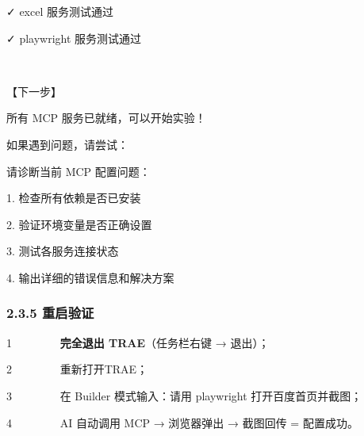 \documentclass[
  american,
  chinese,
]{ctexart}
\begin{document}
\foreignlanguage{american}{✓}\foreignlanguage{american}{ excel }{服务测试通过}\foreignlanguage{american}{}

\foreignlanguage{american}{✓}\foreignlanguage{american}{ playwright }{服务测试通过}\foreignlanguage{american}{}

\foreignlanguage{american}{}

~

{【下一步】}\foreignlanguage{american}{}

{所有}\foreignlanguage{american}{ MCP }{服务已就绪，可以开始实验！}\foreignlanguage{american}{}

{如果遇到问题，请尝试：}\foreignlanguage{american}{}

{请诊断当前}\foreignlanguage{american}{ MCP }{配置问题：}\foreignlanguage{american}{}

\foreignlanguage{american}{1. }{检查所有依赖是否已安装}\foreignlanguage{american}{}

\foreignlanguage{american}{2. }{验证环境变量是否正确设置}\foreignlanguage{american}{}

\foreignlanguage{american}{3. }{测试各服务连接状态}\foreignlanguage{american}{}

\foreignlanguage{american}{4. }{输出详细的错误信息和解决方案}\foreignlanguage{american}{}

\subsubsection{\texorpdfstring{\foreignlanguage{american}{2.3.5 }{重启验证}\foreignlanguage{american}{}}{2.3.5 重启验证}}\label{ux91cdux542fux9a8cux8bc1}

\foreignlanguage{american}{{1{~~~~~~~~
}}}\textbf{{完全退出}\foreignlanguage{american}{ TRAE}}{（任务栏右键}{ \foreignlanguage{american}{→ }}{退出）；}\foreignlanguage{american}{}

\foreignlanguage{american}{{2{~~~~~~~~
}}}{\foreignlanguage{american}{重新打开}}\foreignlanguage{american}{ {TRAE{；}}}

\foreignlanguage{american}{{3{~~~~~~~~
}}}\foreignlanguage{american}{在}\foreignlanguage{american}{ Builder }{\foreignlanguage{american}{模式输入：请用}}\foreignlanguage{american}{ playwright }{{\foreignlanguage{american}{打开百度首页并截图}}}{\foreignlanguage{american}{；}}

\foreignlanguage{american}{{4{~~~~~~~~
}}}\foreignlanguage{american}{AI }{自动调用}\foreignlanguage{american}{ MCP → }{浏览器弹出}{ \foreignlanguage{american}{→ }}{截图回传}\foreignlanguage{american}{ = }{配置成功。}\foreignlanguage{american}{}
\end{document}
